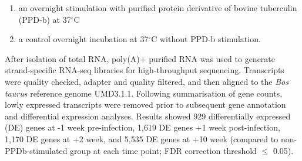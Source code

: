 \documentclass[\main/boa.tex]{subfiles}
\begin{document}
\begin{enumerate}
\def\labelenumi{\alph{enumi}.}
\tightlist
\item
  an overnight stimulation with purified protein derivative of bovine
  tuberculin (PPD-b) at 37\(^\circ\)C
\item
  a control overnight incubation at 37\(^\circ\)C without PPD-b
  stimulation.
\end{enumerate}

After isolation of total RNA, poly(A)+ purified RNA was used to generate
strand-specific RNA-seq libraries for high-throughput sequencing.
Transcripts were quality checked, adapter and quality filtered, and then
aligned to the \emph{Bos taurus} reference genome UMD3.1.1. Following
summarisation of gene counts, lowly expressed transcripts were removed
prior to subsequent gene annotation and differential expression
analyses. Results showed 929 differentially expressed (DE) genes at -1
week pre-infection, 1,619 DE genes +1 week post-infection, 1,170 DE
genes at +2 week, and 5,535 DE genes at +10 week (compared to
non-PPDb-stimulated group at each time point; FDR correction threshold
\(\leq\) 0.05).
\end{document}
